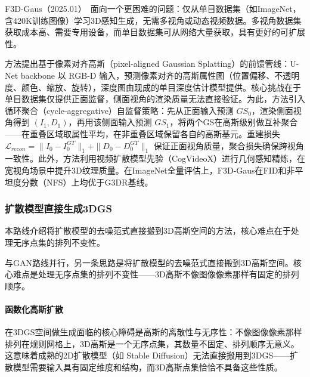 F3D-Gaus（2025.01）~\cite{2501_06714}面向一个更困难的问题：仅从单目数据集（如ImageNet，含420K训练图像）学习3D感知生成，无需多视角或动态视频数据。多视角数据集获取成本高、需要专用设备，而单目数据集可从网络大量获取，具有更好的可扩展性。

方法提出基于像素对齐高斯（pixel-aligned Gaussian Splatting）的前馈管线：U-Net backbone 以 RGB-D 输入，预测像素对齐的高斯属性图（位置偏移、不透明度、颜色、缩放、旋转），深度图由现成的单目深度估计模型提供。核心挑战在于单目数据集仅提供正面监督，侧面视角的渲染质量无法直接验证。为此，方法引入循环聚合（cycle-aggregative）自监督策略：先从正面输入预测 $GS_0$，渲染侧面视角得到 $(I_1, D_1)$，再用该侧面输入预测 $GS_1$，将两个GS在高斯级别做互补聚合——在重叠区域取属性平均，在非重叠区域保留各自的高斯基元。重建损失 $\mathcal{L}_{recon} = \|I_0 - I_0^{GT}\|_1 + \|D_0 - D_0^{GT}\|_1$ 保证正面视角质量，聚合损失确保跨视角一致性。此外，方法利用视频扩散模型先验（CogVideoX）进行几何感知精炼，在宽视角场景中提升3D纹理质量。在ImageNet全量评估上，F3D-Gaus在FID和非平坦度分数（NFS）上均优于G3DR基线。

\subsubsection{扩散模型直接生成3DGS}

本路线介绍将扩散模型的去噪范式直接搬到3D高斯空间的方法，核心难点在于处理无序点集的排列不变性。

与GAN路线并行，另一条思路是将扩散模型的去噪范式直接搬到3D高斯空间。核心难点是处理无序点集的排列不变性——3D高斯不像图像像素那样有固定的排列顺序。

\paragraph{函数化高斯扩散}

在3DGS空间做生成面临的核心障碍是高斯的离散性与无序性：不像图像像素那样排列在规则网格上，3D高斯是一个无序点集，其数量不固定、排列顺序无意义。这意味着成熟的2D扩散模型（如 Stable Diffusion）无法直接搬用到3DGS——扩散模型需要输入具有固定维度和结构，而3D高斯点集恰恰不具备这些性质。

